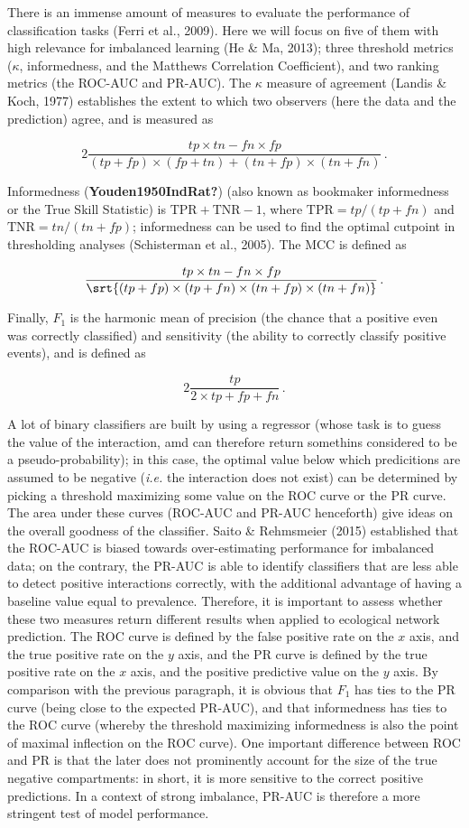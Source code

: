 \documentclass[11pt]{article}
\begin{document}
There is an immense amount of measures to evaluate the performance of
classification tasks (Ferri et al., 2009). Here we will focus on five of
them with high relevance for imbalanced learning (He \& Ma, 2013); three
threshold metrics (\(\kappa\), informedness, and the Matthews
Correlation Coefficient), and two ranking metrics (the ROC-AUC and
PR-AUC). The \(\kappa\) measure of agreement (Landis \& Koch, 1977)
establishes the extent to which two observers (here the data and the
prediction) agree, and is measured as

\[
2\frac{tp\times tn - fn\times fp}{(tp+fp)\times (fp+tn)+(tn+fp)\times (tn+fn)} \,.
\]

Informedness (\textbf{Youden1950IndRat?}) (also known as bookmaker
informedness or the True Skill Statistic) is
\(\text{TPR}+\text{TNR}-1\), where \(\text{TPR}= tp/(tp+fn)\) and
\(\text{TNR} = tn/(tn+fp)\); informedness can be used to find the
optimal cutpoint in thresholding analyses (Schisterman et al., 2005).
The MCC is defined as

\[
\frac{tp\times tn - fn\times fp}{\srt{(tp+fp)\times (tp+fn)\times (tn+fp)\times (tn+fn)}} \,.
\]

Finally, \(F_1\) is the harmonic mean of precision (the chance that a
positive even was correctly classified) and sensitivity (the ability to
correctly classify positive events), and is defined as

\[
2\frac{tp}{2\times tp + fp + fn}\,.
\]

A lot of binary classifiers are built by using a regressor (whose task
is to guess the value of the interaction, amd can therefore return
somethins considered to be a pseudo-probability); in this case, the
optimal value below which predicitions are assumed to be negative
(\emph{i.e.} the interaction does not exist) can be determined by
picking a threshold maximizing some value on the ROC curve or the PR
curve. The area under these curves (ROC-AUC and PR-AUC henceforth) give
ideas on the overall goodness of the classifier. Saito \& Rehmsmeier
(2015) established that the ROC-AUC is biased towards over-estimating
performance for imbalanced data; on the contrary, the PR-AUC is able to
identify classifiers that are less able to detect positive interactions
correctly, with the additional advantage of having a baseline value
equal to prevalence. Therefore, it is important to assess whether these
two measures return different results when applied to ecological network
prediction. The ROC curve is defined by the false positive rate on the
\(x\) axis, and the true positive rate on the \(y\) axis, and the PR
curve is defined by the true positive rate on the \(x\) axis, and the
positive predictive value on the \(y\) axis. By comparison with the
previous paragraph, it is obvious that \(F_1\) has ties to the PR curve
(being close to the expected PR-AUC), and that informedness has ties to
the ROC curve (whereby the threshold maximizing informedness is also the
point of maximal inflection on the ROC curve). One important difference
between ROC and PR is that the later does not prominently account for
the size of the true negative compartments: in short, it is more
sensitive to the correct positive predictions. In a context of strong
imbalance, PR-AUC is therefore a more stringent test of model
performance.
\end{document}
